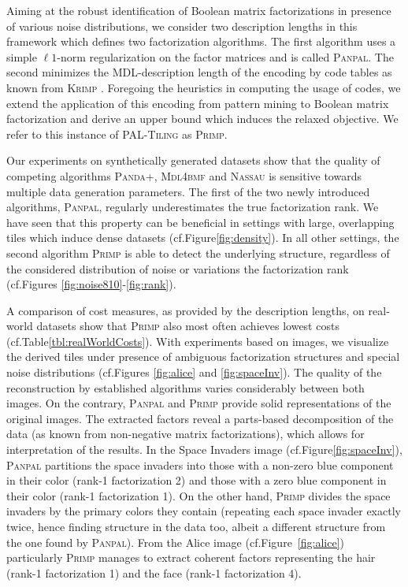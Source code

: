 Aiming at the robust identification of Boolean matrix factorizations in presence of various noise distributions, we consider two description lengths in this framework which defines two factorization algorithms. The first algorithm uses a simple $\ell 1$-norm regularization on the factor matrices and is called \textsc{Panpal}. The second minimizes the MDL-description length of the encoding by code tables as known from \textsc{Krimp} \citep{siebes2006item}. Foregoing the heuristics in computing the usage of codes, we extend the application of this encoding from pattern mining to Boolean matrix factorization and derive an upper bound which induces the relaxed objective. We refer to this instance of \textsc{PAL-Tiling} as \textsc{Primp}.

Our experiments on synthetically generated datasets show  that the quality of competing algorithms \textsc{Panda+}, \textsc{Mdl4bmf} and \textsc{Nassau} is sensitive towards multiple data generation parameters. The first of the two newly introduced algorithms, \textsc{Panpal}, regularly underestimates the true factorization rank. We have seen that this property can be beneficial in settings with large, overlapping tiles which induce dense datasets (cf.\@ Figure\@ \ref{fig:density}). In all other settings, the second algorithm \textsc{Primp} is able to detect the underlying structure, regardless of the considered distribution of noise or variations the factorization rank (cf.\@ Figures \ref{fig:noise810}-\ref{fig:rank}). 

A comparison of cost measures, as provided by the description lengths, on real-world datasets show that \textsc{Primp} also most often achieves lowest costs (cf.\@ Table\@ \ref{tbl:realWorldCosts}). With experiments based on images, we visualize the derived tiles under  presence of ambiguous factorization structures and special noise distributions (cf.\@ Figures \ref{fig:alice} and \ref{fig:spaceInv}). The quality of the reconstruction by established algorithms varies considerably between both images. On the contrary, \textsc{Panpal} and \textsc{Primp} provide solid representations of the original images. The extracted factors reveal a parts-based decomposition of the data (as known from non-negative matrix factorizations), which allows for interpretation of the results. In the Space Invaders image (cf.\@ Figure\@ \ref{fig:spaceInv}), \textsc{Panpal} partitions the space invaders into those with a non-zero blue component in their color (rank-1 factorization 2) and those with a zero blue component in their color (rank-1 factorization 1). On the other hand, \textsc{Primp} divides the space invaders by the primary colors they contain (repeating each space invader exactly twice, hence finding structure in the data too, albeit a different structure from the one found by \textsc{Panpal}). From the Alice image (cf.\@ Figure~\ref{fig:alice}) particularly \textsc{Primp} manages to extract coherent factors representing the hair (rank-1 factorization 1) and the face (rank-1 factorization 4).

